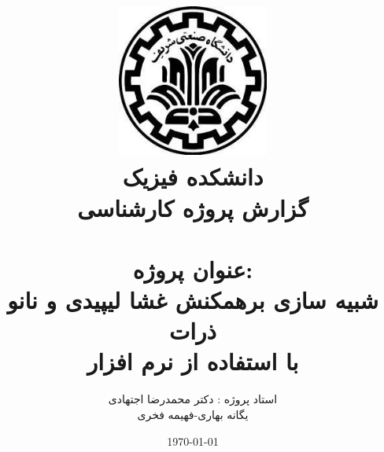 \documentclass[12pt,onecolumn,a4paper]{report}
\begin{document}
\title{\includegraphics[width=5cm, height= 5cm]{3.jpg}\\\Large{دانشکده فیزیک}\\{\LARGE{گزارش پروژه کارشناسی}}\\{\\{\Huge{عنوان پروژه:}\\\Huge{شبیه سازی برهمکنش غشا لیپیدی و نانو ذرات \\با استفاده از نرم افزار  }}} }
\author{\LARGE{استاد پروژه : دکتر محمدرضا اجتهادی}\\\LARGE{یگانه بهاری-فهیمه فخری}}
\date{\LARGE{\today}}
\maketitle
\end{document}

